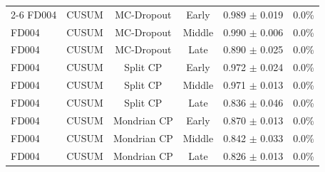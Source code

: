 \begin{table}[t]
\begin{tabular}{llcccc}
\cmidrule{2-6}
FD004 & CUSUM & MC-Dropout & Early & 0.989 $\pm$ 0.019 & 0.0\% \\
FD004 & CUSUM & MC-Dropout & Middle & 0.990 $\pm$ 0.006 & 0.0\% \\
FD004 & CUSUM & MC-Dropout & Late & 0.890 $\pm$ 0.025 & 0.0\% \\
FD004 & CUSUM & Split CP & Early & 0.972 $\pm$ 0.024 & 0.0\% \\
FD004 & CUSUM & Split CP & Middle & 0.971 $\pm$ 0.013 & 0.0\% \\
FD004 & CUSUM & Split CP & Late & 0.836 $\pm$ 0.046 & 0.0\% \\
FD004 & CUSUM & Mondrian CP & Early & 0.870 $\pm$ 0.013 & 0.0\% \\
FD004 & CUSUM & Mondrian CP & Middle & 0.842 $\pm$ 0.033 & 0.0\% \\
FD004 & CUSUM & Mondrian CP & Late & 0.826 $\pm$ 0.013 & 0.0\% \\
\bottomrule
\end{tabular}
\end{table}
